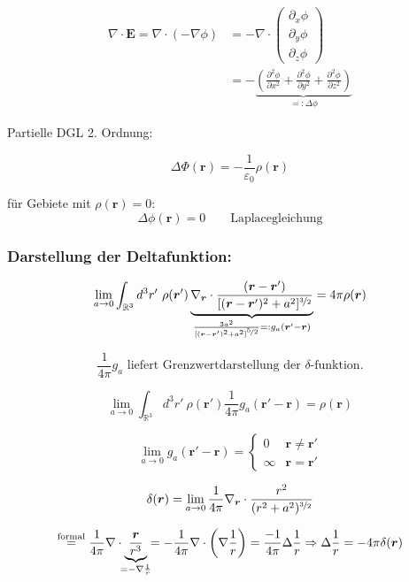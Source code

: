 \documentclass[titlepage,11pt,a4paper,ngerman]{report}
\renewcommand{\Phi}{\varPhi}
\renewcommand{\vec}[1]{\boldsymbol{#1}}
\renewcommand{\epsilon}{\varepsilon}
\renewcommand{\paragraph}[1]{\subsubsection{#1}}
\newcommand{\frbox}[2]{\begin{tcolorbox}[colback=white,colframe=red!75!black,fonttitle=\bfseries,title=#1]#2\end{tcolorbox}}
\begin{document}
\begin{align*}\nabla \cdot \vec{E} = \nabla \cdot (- \nabla \phi) &= - \nabla \cdot \begin{pmatrix} 
\partial_x \phi \\
\partial_y \phi \\ 
\partial_z \phi 
\end{pmatrix} \\
&= - \underbrace{\left( \frac{\partial^2 \phi}{\partial x^2} + \frac{\partial^2 \phi}{\partial y^2} + \frac{\partial^2 \phi}{\partial  z^2} \right) }_{=: \Delta \phi}\end{align*}

Partielle DGL 2. Ordnung:
\frbox{Poissongleichung}{$$\Delta \Phi(\vec{r}) = - \frac{1}{\epsilon_0} \rho(\vec{r})$$}

für Gebiete mit $\rho (\vec{r}) = 0$:
$$\Delta \phi (\vec{r}) = 0 \qquad \textrm{Laplacegleichung}$$

\paragraph{Darstellung der Deltafunktion:}

$$\lim_{a \to 0} \int_{\mathbb{R}^3} d^3r'\ \rho(\vec{r}')\underbrace{\nabla_{\vec{r}} \cdot \frac{(\vec{r} - \vec{r}')}{[(\vec{r} - \vec{r}')^2 + a^2]^{\nicefrac{3}{2}}}}_{\frac{3 a^2}{[(\vec{r} - \vec{r}')^2 + a^2]^{\nicefrac{5}{2}}} =: g_a(\vec{r}' - \vec{r})} = 4 \pi \rho(\vec{r})$$

$$\frac{1}{4 \pi} g_a \textrm{ liefert Grenzwertdarstellung der $\delta$-funktion.}$$

$$\lim_{a\to 0} \int_{\mathbb{R}^3} d^3r'\ \rho(\vec{r}') \frac{1}{4\pi}g_a(\vec{r}'-\vec{r})=\rho(\vec{r})$$

$$\lim_{a \to 0} g_a(\vec{r}' - \vec{r}) = \left\{ \begin{array}{cc}
0 		& \vec{r} \neq  \vec{r}'\\
\infty 	& \vec{r} = 	\vec{r}'
\end{array} \right.$$

$$\delta(\vec{r}) = \lim_{a \to 0} \frac{1}{4 \pi} \nabla_{\vec{r}} \cdot \frac{r^2}{(r^2+a^2)^{\nicefrac{3}{2}}}$$

$$\overset{\textrm{formal}}{=} \frac{1}{4 \pi} \nabla \cdot \underbrace{\frac{\vec{r}}{r^3}}_{\mathclap{= - \nabla \frac{1}{r}}} = - \frac{1}{4 \pi} \nabla \cdot \bigg(\nabla \frac{1}{r}\bigg) = \frac{-1}{4 \pi} \Delta \frac{1}{r} \Rightarrow \Delta \frac{1}{r} = -4 \pi \delta(\vec{r})$$
\end{document}
